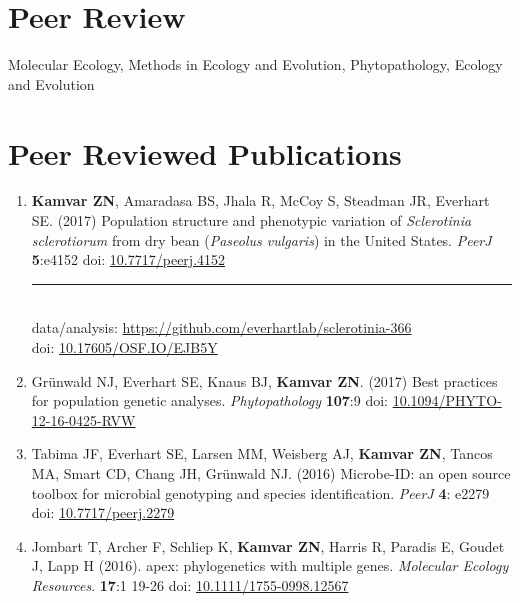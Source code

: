 
\section{Peer Review}

Molecular Ecology, Methods in Ecology and Evolution, Phytopathology,
Ecology and Evolution

\section{Peer Reviewed Publications}

\begin{enumerate}[leftmargin = 14pt]

	\item \textbf{Kamvar ZN}, Amaradasa BS, Jhala R, McCoy S, Steadman JR,
	Everhart SE. (2017) Population structure and phenotypic variation of
	\textit{Sclerotinia sclerotiorum} from dry bean (\textit{Paseolus vulgaris})
	in the United States. \textit{PeerJ} \textbf{5}:e4152 doi: \href{https://doi.org/10.7717/peerj.4152}{10.7717/peerj.4152}\\
	\rule[0.25\baselineskip]{0.25\textwidth}{0.5pt}\\
	data/analysis: \href{https://github.com/everhartlab/sclerotinia-366#readme}{https://github.com/everhartlab/sclerotinia-366}\\
	doi:\phantom{t/analysis:}
	\href{https://doi.org/10.17605/OSF.IO/EJB5Y}{10.17605/OSF.IO/EJB5Y}

	\vspace{3pt}

	\item Gr\"unwald NJ, Everhart SE, Knaus BJ, \textbf{Kamvar ZN}. (2017)
	Best practices for population genetic analyses. \textit{Phytopathology}
	\textbf{107}:9 doi: \href{http://doi.org/10.1094/PHYTO-12-16-0425-RVW}{10.1094/PHYTO-12-16-0425-RVW}

	\vspace{3pt}

	\item Tabima JF, Everhart SE, Larsen MM, Weisberg AJ, \textbf{Kamvar ZN}, Tancos MA,
	Smart CD, Chang JH, Gr\"unwald NJ. (2016) Microbe-ID: an open source toolbox
	for microbial genotyping and species identification. \textit{PeerJ} \textbf{4}: e2279
	doi: \href{https://doi.org/10.7717/peerj.2279}{10.7717/peerj.2279}

	\vspace{3pt}

	\item Jombart T, Archer F, Schliep K, \textbf{Kamvar ZN}, Harris R, Paradis
	E, Goudet J, Lapp H (2016). apex: phylogenetics with multiple genes.
	\textit{Molecular Ecology Resources}. \textbf{17}:1 19-26 doi:
	\href{http://doi.org/10.1111/1755-0998.12567}{10.1111/1755-0998.12567}


\end{enumerate}
